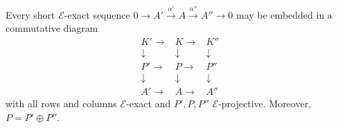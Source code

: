 Every short $\mathcal{E}$-exact sequence $0 \to A' \xrightarrow{\alpha'} A \xrightarrow{\alpha''} A'' \to 0$ may be embedded in a commutative diagram
\[
\begin{array}{ccccc}
K' \to & K \to & K'' \\
\downarrow & \downarrow & \downarrow \\
P' \to & P \to & P'' \\
\downarrow & \downarrow & \downarrow \\
A' \to & A \to & A''
\end{array}
\]
with all rows and columns $\mathcal{E}$-exact and $P', P, P''$ $\mathcal{E}$-projective. Moreover, $P = P' \oplus P''$.